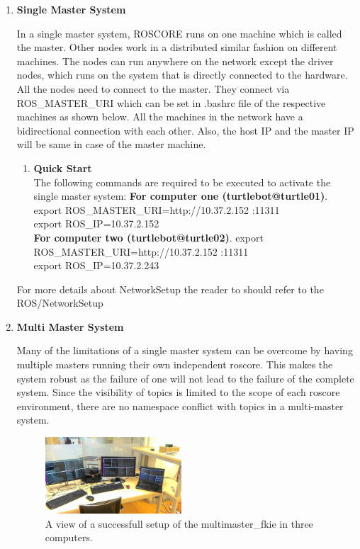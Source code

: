 \documentclass[journal]{IEEEtran}
\begin{document}
\begin{enumerate}
\begin{enumerate} 
\item \textbf {Single Master System}

In a single master system, ROSCORE runs on one machine
which is called the master. Other nodes work in a distributed similar fashion on different machines. The nodes can run anywhere on the network except the driver nodes, which runs on the system that is directly connected to the hardware. All the nodes need to connect to the master. They connect via ROS{\_}MASTER{\_}URI which can be set in .bashrc file of the respective machines as shown below. All the machines in the network have a bidirectional connection with each other. Also, the host IP and the master IP will be same in case of the master machine.



\begin{enumerate}
\item \textbf {Quick Start}\\
The following commands are required to be executed to activate the single master system:
\textbf{For computer one (turtlebot@turtle01)}.\\
export ROS{\_}MASTER{\_}URI=http://10.37.2.152 :11311\\
export ROS{\_}IP=10.37.2.152\\
\textbf{For computer two (turtlebot@turtle02)}.
export ROS{\_}MASTER{\_}URI=http://10.37.2.152 :11311\\
export ROS{\_}IP=10.37.2.243
\end{enumerate}
For more details about NetworkSetup the reader to should refer to the ROS/NetworkSetup \cite{temp11}


\item \textbf {Multi Master System}

Many of the limitations of a single master system can
be overcome by having multiple masters running their own
independent roscore. This makes
the system robust as the failure of one will not lead to the
failure of the complete system. Since the visibility of topics is
limited to the scope of each roscore environment, there are
no namespace conflict with topics in a multi-master system.

\begin{figure}[!h]
\begin{center}
\includegraphics[width=2in]{multi2.jpg}
\caption{A view of a successfull setup of the multimaster{\_}fkie in three computers.}
\end{center}
\label{fig:mypicture4}
\end{figure}



\end{enumerate}
\end{enumerate}
\end{document}
